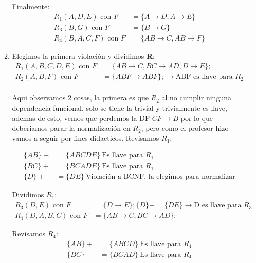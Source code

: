 \begin{itemize}
\begin{enumerate}[label=\alph*.]
        Finalmente: 
        \begin{align*}
            R_1 (A,D,E) \text{ con } F &= \{ A \rightarrow D, A \rightarrow E \} \\
            R_3 (B,G) \text{ con } F &= \{B \rightarrow G\} \\
            R_4 (B,A,C,F) \text{ con } F &= \{AB \rightarrow C, AB \rightarrow F\}
        \end{align*}
        \vspace{.2cm}
        
        \item 
        Elegimos la primera violación y dividimos \textbf{R}:
        \begin{align*}
            R_1 (A,B,C,D,E) \text{ con } F &= \{AB \rightarrow C, BC \rightarrow AD, D \rightarrow E\} ; \\
            R_2 (A,B,F) \text{ con } F &= \{ABF \rightarrow ABF \} ; \xrightarrow{} \text{ABF es llave para } R_2 \\
        \end{align*}

        Aqui observamos 2 cosas, la primera es que $R_2$ al no cumplir ninguna dependencia funcional, solo se tiene la trivial y trivialmente es llave, ademas de esto, vemos que perdemos la DF $CF \rightarrow B$ por lo que deberiamos parar la normalización en $R_2$, pero como el profesor hizo vamos a seguir por fines didacticos. Revisamos $R_1$:

        \begin{align*}
            \{AB\}+ &= \{ABCDE\} \ \text{Es llave para } R_1 \\
            \{BC\}+ &= \{BCADE\} \ \text{Es llave para } R_1 \\
            \{D\}+ &= \{DE\} \ \text{Violación a BCNF, la elegimos para normalizar}
        \end{align*}

        Dividimos $R_1$:
        \begin{align*}
            R_3 (D,E) \text{ con } F &= \{D \rightarrow E\} ; \{D\}+ = \{DE\} \xrightarrow{} \text{D es llave para } R_3 \\
            R_4 (D,A,B,C) \text{ con } F &= \{AB \rightarrow C, BC \rightarrow AD\} ; 
        \end{align*}

        Revisamos $R_4$:
        \begin{align*}
            \{AB\}+ &= \{ABCD\} \ \text{Es llave para } R_4 \\
            \{BC\}+ &= \{BCAD\} \ \text{Es llave para } R_4 \\
        \end{align*}


\end{enumerate}
\end{itemize}
